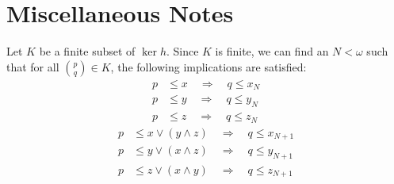 



















\section{Miscellaneous Notes}
\noindent Let $K$ be a finite subset of $\ker h$.  Since $K$ is finite, we can find an $N < \omega$ such that for all $\binom{p}{q} \in K$, the following implications are satisfied:
\begin{align}
p &\leqslant x \quad \Longrightarrow \quad q \leqslant x_N\nonumber\\
p &\leqslant y \quad \Longrightarrow \quad q \leqslant y_N\label{eq:imp1}\\
p &\leqslant z \quad \Longrightarrow \quad q \leqslant z_N\nonumber
\end{align}
\begin{align}
p &\leqslant x \vee (y \wedge z) \quad \Longrightarrow \quad q \leqslant x_{N+1}\nonumber\\
p &\leqslant y \vee (x \wedge z) \quad \Longrightarrow \quad q \leqslant y_{N+1}\label{eq:imp2}\\
p &\leqslant z \vee (x \wedge y) \quad \Longrightarrow \quad q \leqslant z_{N+1}\nonumber
\end{align}

